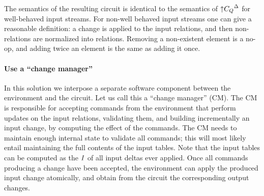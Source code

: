 The semantics of the resulting circuit is identical to the semantics of ${{\uparrow}C_Q}^{\Delta}$
for well-behaved input streams.  For non-well behaved input streams one can give
a reasonable definition: a change is applied to the input relations, and then non-relations
are normalized into relations.  Removing a non-existent element is a no-op, and adding twice
an element is the same as adding it once.

\paragraph{Use a ``change manager''}

In this solution we interpose a separate software component between the environment
and the circuit.  Let us call this a ``change manager'' (CM).  The CM
is responsible for accepting commands from the environment that perform updates on the input
relations, validating them, and building incrementally an input change, by computing the
effect of the commands.  The CM needs to maintain enough internal state to validate all commands; this
will most likely entail maintaining the full contents of the input tables.  Note that
the input tables can be computed as the $\mathit{I}$ of all input deltas ever applied.  Once all
commands producing a change have been accepted, the environment can apply the produced input change
atomically, and obtain from the circuit the corresponding output changes.


